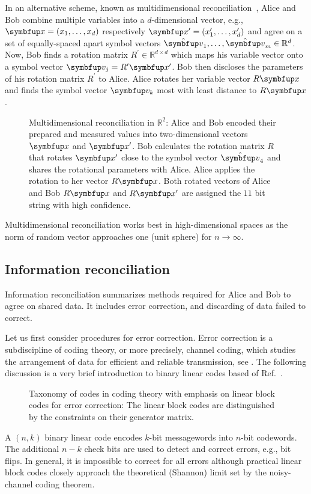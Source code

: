 In an alternative scheme, known as multidimensional reconciliation~\cite{Leverrier2008}, Alice and Bob combine multiple variables into a $d$-dimensional vector, e.g., $\vb{x}=(x_1,\dots,x_d)$ respectively $\vb{x}^\prime=(x_1^\prime,\dots,x_d^\prime)$ and agree on a set of equally-spaced apart symbol vectors $\vu{v}_1,\dots,\vu{v}_m\in\mathbb{R}^d$.
Now, Bob finds a rotation matrix $R^\prime\in\mathbb{R}^{d\times d}$ which maps his variable vector onto a symbol vector $\vb{v}_j=R^\prime\vb{x}^\prime$.
Bob then discloses the parameters of his rotation matrix $R^\prime$ to Alice.
Alice rotates her variable vector $R\vb{x}$ and finds the symbol vector $\vb{v}_k$ most with least distance to $R\vb{x}$.
\begin{figure}[htb]
	\centering
	
	\caption{Multidimensional reconciliation in $\mathbb{R}^2$: Alice and Bob encoded their prepared and measured values into two-dimensional vectors $\vb{x}$ and $\vb{x}^\prime$. Bob calculates the rotation matrix $R$ that rotates $\vb{x}^\prime$ close to the symbol vector $\vu{v}_4$ and shares the rotational parameters with Alice. Alice applies the rotation to her vector $R\vb{x}$. Both rotated vectors of Alice and Bob $R\vb{x}$ and $R\vb{x}^\prime$ are assigned the $11$ bit string with high confidence.}\label{fig:multidimensional_reconciliation}
\end{figure}
Multidimensional reconciliation works best in high-dimensional spaces as the norm of random vector approaches one (unit sphere) for $n\to\infty$.

\FloatBarrier
\subsection{Information reconciliation}

Information reconciliation summarizes methods required for Alice and Bob to agree on shared data.
It includes error correction, and discarding of data failed to correct.

Let us first consider procedures for error correction.
Error correction is a subdiscipline of coding theory, or more precisely, channel coding, which studies the arrangement of data for efficient and reliable transmission, see .
The following discussion is a very brief introduction to binary linear codes based of Ref.~\cite{MacKay2003,Mildenberger2013}.
\begin{figure}[htb]
	\centering
	
	\caption{Taxonomy of codes in coding theory with emphasis on linear block codes for error correction: The linear block codes are distinguished by the constraints on their generator matrix.}\label{fig:error_correction_codes}
\end{figure}
A $(n,k)$ binary linear code encodes $k$-bit messagewords into $n$-bit codewords.
The additional $n-k$ check bits are used to detect and correct errors, e.g., bit flips.
In general, it is impossible to correct for all errors although practical linear block codes closely approach the theoretical (Shannon) limit set by the noisy-channel coding theorem.

